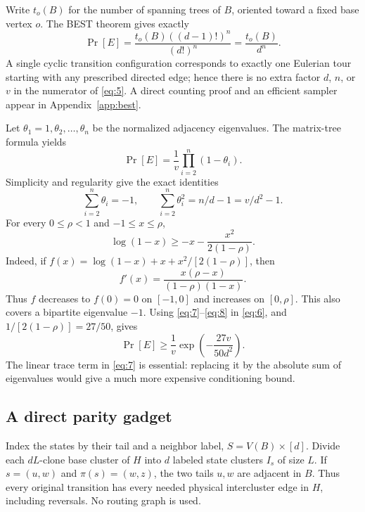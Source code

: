 \documentclass[11pt]{article}
\theoremstyle{definition}
\theoremstyle{remark}
\numberwithin{equation}{section}
\begin{document}
Write \(t_o(B)\) for the number of spanning trees of \(B\), oriented
toward a fixed base vertex \(o\). The BEST theorem \cite{FarrellLevine2015} gives exactly
\begin{equation}\label{eq:5}
\Pr[E]=\frac{t_o(B)((d-1)!)^n}{(d!)^n}
                          =\frac{t_o(B)}{d^n}.
\end{equation}
A single cyclic transition configuration corresponds to exactly one
Eulerian tour starting with any prescribed directed edge; hence there
is no extra factor \(d\), \(n\), or \(v\) in the numerator of \eqref{eq:5}.
A direct counting proof and an efficient sampler appear in Appendix~\ref{app:best}.

Let \(\theta_1=1,\theta_2,\ldots,\theta_n\) be the normalized
adjacency eigenvalues. The matrix-tree formula yields
\begin{equation}\label{eq:6}
\Pr[E]=\frac1v\prod_{i=2}^n(1-\theta_i).
\end{equation}
Simplicity and regularity give the exact identities
\begin{equation}\label{eq:7}
\sum_{i=2}^n\theta_i=-1,\qquad
        \sum_{i=2}^n\theta_i^2=n/d-1=v/d^2-1.
\end{equation}
For every \(0\le\rho<1\) and \(-1\le x\le\rho\),
\begin{equation}\label{eq:8}
\log(1-x)\ge -x-\frac{x^2}{2(1-\rho)}.
\end{equation}
Indeed, if
\(f(x)=\log(1-x)+x+x^2/[2(1-\rho)]\), then
\[
                 f'(x)=\frac{x(\rho-x)}{(1-\rho)(1-x)}.
\]
Thus \(f\) decreases to \(f(0)=0\) on \([-1,0]\) and increases
on \([0,\rho]\). This also covers a bipartite eigenvalue \(-1\).
Using \eqref{eq:7}--\eqref{eq:8} in \eqref{eq:6}, and \(1/[2(1-\rho)]=27/50\), gives
\begin{equation}\label{eq:9}
\Pr[E]\ge
             \frac1v\exp\left(-\frac{27v}{50d^2}\right).
\end{equation}
The linear trace term in \eqref{eq:7} is essential: replacing it by the
absolute sum of eigenvalues would give a much more expensive
conditioning bound.

\subsection{A direct parity gadget}\label{sub:gadget}
Index the states by their tail and a neighbor label,
\(S=V(B)\times[d]\). Divide each \(dL\)-clone base cluster
of \(H\) into \(d\) labeled state clusters \(I_s\) of size \(L\).
If \(s=(u,w)\) and \(\pi(s)=(w,z)\), the two tails \(u,w\)
are adjacent in \(B\). Thus every original transition has every
needed physical intercluster edge in \(H\), including reversals.
No routing graph is used.
\end{document}
